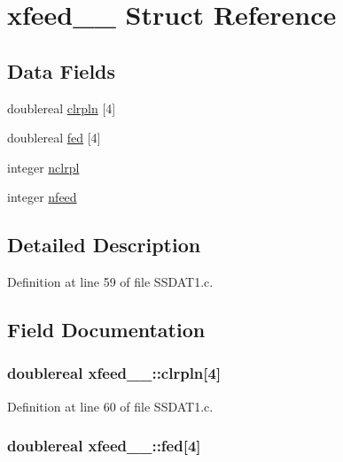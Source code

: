 \hypertarget{structxfeed__1__}{}\section{xfeed\+\_\+\_\+ Struct Reference}
\label{structxfeed__1__}
\subsection*{Data Fields}
\begin{DoxyCompactItemize}
\item 
doublereal \hyperlink{structxfeed__1___adf4a5f2b87c3bfb98825ef5795d70f5d}{clrpln} \mbox{[}4\mbox{]}
\item 
doublereal \hyperlink{structxfeed__1___a18108e4dd904d0b54a1fb0cc5a0b8f93}{fed} \mbox{[}4\mbox{]}
\item 
integer \hyperlink{structxfeed__1___a21675a6e75a52325f906f2044f224839}{nclrpl}
\item 
integer \hyperlink{structxfeed__1___a11a22a65879076c641716c669ae94232}{nfeed}
\end{DoxyCompactItemize}


\subsection{Detailed Description}


Definition at line 59 of file S\+S\+D\+A\+T1.\+c.



\subsection{Field Documentation}
\subsubsection[{\texorpdfstring{clrpln}{clrpln}}]{\setlength{\rightskip}{0pt plus 5cm}doublereal xfeed\+\_\+\_\+\+::clrpln\mbox{[}4\mbox{]}}\hypertarget{structxfeed__1___adf4a5f2b87c3bfb98825ef5795d70f5d}{}\label{structxfeed__1___adf4a5f2b87c3bfb98825ef5795d70f5d}


Definition at line 60 of file S\+S\+D\+A\+T1.\+c.

\subsubsection[{\texorpdfstring{fed}{fed}}]{\setlength{\rightskip}{0pt plus 5cm}doublereal xfeed\+\_\+\_\+\+::fed\mbox{[}4\mbox{]}}\hypertarget{structxfeed__1___a18108e4dd904d0b54a1fb0cc5a0b8f93}{}\label{structxfeed__1___a18108e4dd904d0b54a1fb0cc5a0b8f93}


